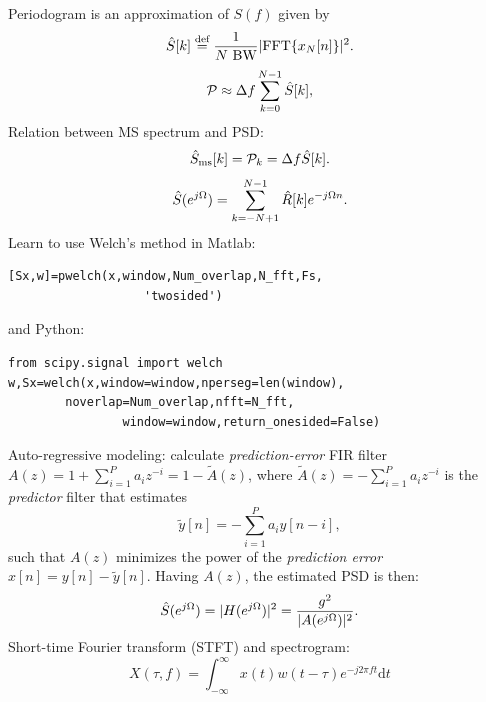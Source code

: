 Periodogram is an approximation of $S(f)$ given by
\begin{equation}
\hat S[k] \stackrel{\text{def}}{=} \frac{1}{N \textrm{~} {\textrm{BW}}} |\textrm{FFT} \{ x_N[n] \}|^2.
\label{eq:periodogram_discretetime2}
\end{equation} 
\begin{equation}
{\cal P} \approx \Delta f \sum_{k=0}^{N-1} \hat S[k],
\label{eq:periodogram_discretetime3}
\end{equation}
Relation between MS spectrum and PSD:
\begin{equation}
\hat S_{\textrm{ms}}[k] = {\cal P}_k = \Delta f \hat S[k].
\label{eq:powerPerTone}
\end{equation}
\begin{equation}
\hat S(e^{j {\Omega}}) = \sum_{k=-N+1}^{N-1} \hat R[k] e^{-j {\Omega} n}.
\label{eq:psd_via_xcorr}
\end{equation}
Learn to use Welch's method in Matlab:
\begin{verbatim}
[Sx,w]=pwelch(x,window,Num_overlap,N_fft,Fs,
				   'twosided')
\end{verbatim}
and Python:
\begin{verbatim}
from scipy.signal import welch
w,Sx=welch(x,window=window,nperseg=len(window),
        noverlap=Num_overlap,nfft=N_fft,
				window=window,return_onesided=False)
\end{verbatim}
Auto-regressive modeling: calculate \emph{prediction-error} FIR filter $A(z)=1+\sum_{i=1}^P a_i z^{-i} = 1-\tilde A(z)$, where $\tilde A(z)=-\sum_{i=1}^P a_i z^{-i}$ is the \emph{predictor} filter that estimates
\begin{equation}
\tilde y[n] = -\sum_{i=1}^P a_i y[n-i],
\label{eq:lpcPrediction}
\end{equation}
such that $A(z)$ minimizes the power of the \emph{prediction error} $x[n] = y[n] - \tilde y[n]$. Having $A(z)$, the estimated PSD is then:
\begin{equation}
\hat S(e^{j {\Omega}}) = |H(e^{j {\Omega}})|^2 = \frac {g^2} {|A(e^{j {\Omega}})|^2}.
\label{eq:ar_psd}
\end{equation}
Short-time Fourier transform (STFT) and spectrogram:
\begin{equation}
X(\tau,f) = \int_{-\infty}^{\infty} x(t) w(t-\tau) e^{-j 2 \pi f t} \textrm{d}t
\label{eq:stft}
\end{equation}
